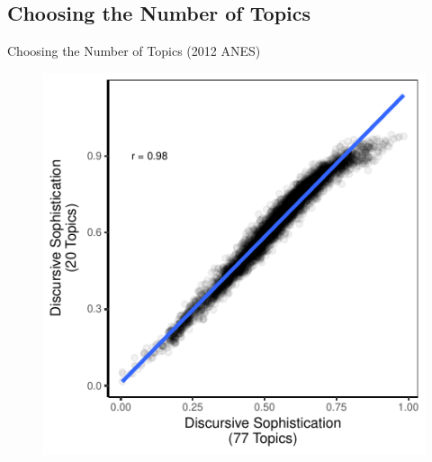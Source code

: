 \subsection{Choosing the Number of Topics}
\begin{frame}{Choosing the Number of Topics (2012 ANES)}\label{ktopics}
  \begin{figure}
  \includegraphics{fig/ktopic.pdf}
  \end{figure}
\end{frame}

